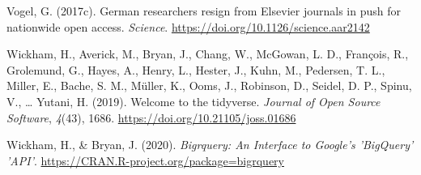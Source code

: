 \documentclass[
]{article}
\newlength{\cslhangindent}
\newlength{\cslentryspacingunit} %
\newenvironment{CSLReferences}[2] %
 {%
  \setlength{\parindent}{0pt}
  \ifodd #1
  \let\oldpar\par
  \def\par{\hangindent=\cslhangindent\oldpar}
  \fi
  \setlength{\parskip}{#2\cslentryspacingunit}
 }%
 {}
\begin{document}
\begin{CSLReferences}{1}{0}
\leavevmode{}%
Vogel, G. (2017c). German researchers resign from {Elsevier} journals in push for nationwide open access. \emph{Science}. \url{https://doi.org/10.1126/science.aar2142}

\leavevmode{}%
Wickham, H., Averick, M., Bryan, J., Chang, W., McGowan, L. D., François, R., Grolemund, G., Hayes, A., Henry, L., Hester, J., Kuhn, M., Pedersen, T. L., Miller, E., Bache, S. M., Müller, K., Ooms, J., Robinson, D., Seidel, D. P., Spinu, V., \ldots{} Yutani, H. (2019). Welcome to the tidyverse. \emph{Journal of Open Source Software}, \emph{4}(43), 1686. \url{https://doi.org/10.21105/joss.01686}

\leavevmode{}%
Wickham, H., \& Bryan, J. (2020). \emph{Bigrquery: {An} {Interface} to {Google}'s '{BigQuery}' '{API}'}. \url{https://CRAN.R-project.org/package=bigrquery}

\end{CSLReferences}
\end{document}
